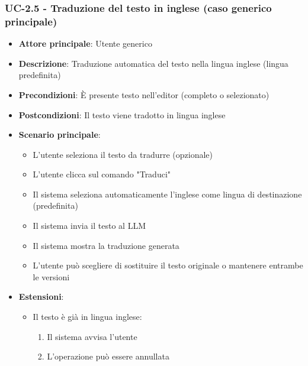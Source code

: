 \documentclass[11pt,a4paper]{article}
\begin{document}
\subsubsection{UC-2.5 - Traduzione del testo in inglese (caso generico principale)}
\begin{itemize}
    \item \textbf{Attore principale}: Utente generico
    \item \textbf{Descrizione}: Traduzione automatica del testo nella lingua inglese (lingua predefinita)
    \item \textbf{Precondizioni}: È presente testo nell'editor (completo o selezionato)
    \item \textbf{Postcondizioni}: Il testo viene tradotto in lingua inglese
    \item \textbf{Scenario principale}:
        \begin{itemize}
            \item L'utente seleziona il testo da tradurre (opzionale)
            \item L'utente clicca sul comando "Traduci"
            \item Il sistema seleziona automaticamente l'inglese come lingua di destinazione (predefinita)
            \item Il sistema invia il testo al LLM
            \item Il sistema mostra la traduzione generata
            \item L'utente può scegliere di sostituire il testo originale o mantenere entrambe le versioni
        \end{itemize}
    \item \textbf{Estensioni}:
        \begin{itemize}
            \item Il testo è già in lingua inglese:
                \begin{enumerate}
                    \item Il sistema avvisa l'utente
                    \item L'operazione può essere annullata
                \end{enumerate}
        \end{itemize}
\end{itemize}
\end{document}

